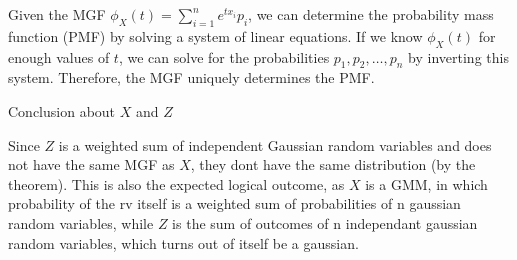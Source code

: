 \documentclass[a4paper,12pt,answers]{exam}
\begin{document}
\begin{questions}
\begin{solution}
Given the MGF $\phi_X(t) = \sum_{i=1}^n e^{t x_i} p_i$, we can determine the probability mass function (PMF) by solving a system of linear equations. If we know $\phi_X(t)$ for enough values of $t$, we can solve for the probabilities $p_1, p_2, \dots, p_n$ by inverting this system. Therefore, the MGF uniquely determines the PMF.

Conclusion about $X$ and $Z$

Since $Z$ is a weighted sum of independent Gaussian random variables and does not have the same MGF as $X$, they dont have the same distribution (by the theorem). This is also the expected logical outcome, as $X$ is a GMM, in which probability of the rv itself is a weighted sum of probabilities of n gaussian random variables, while $Z$ is the sum of outcomes of n independant gaussian random variables, which turns out of itself be a gaussian.
\end{solution}

\end{questions}
\end{document}
